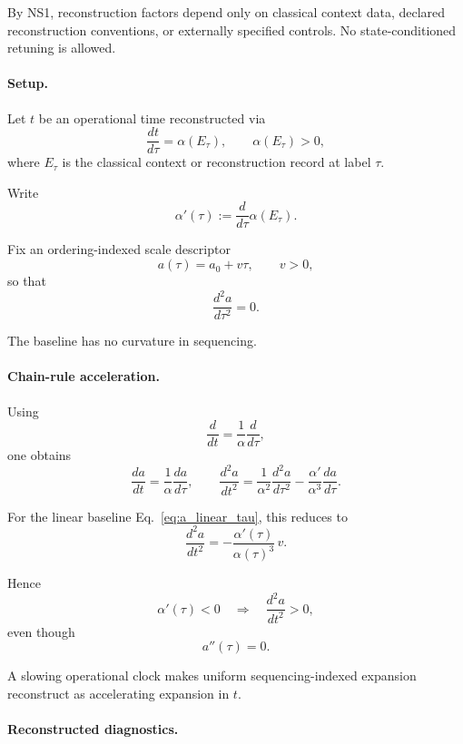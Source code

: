 \documentclass[aps,prx,onecolumn,11pt]{revtex4-2}
\theoremstyle{plain}
\theoremstyle{definition}
\theoremstyle{remark}
\begin{document}
By NS1, reconstruction factors depend only on classical context data,
declared reconstruction conventions, or externally specified controls.
No state-conditioned retuning is allowed.

\paragraph{Setup.}

Let \(t\) be an operational time reconstructed via
\begin{equation}
\frac{dt}{d\tau}
=
\alpha(E_\tau),
\qquad
\alpha(E_\tau)>0,
\label{eq:clock_factor}
\end{equation}
where \(E_\tau\) is the classical context or reconstruction record at
label \(\tau\).

Write
\[
\alpha'(\tau)
:=
\frac{d}{d\tau}\alpha(E_\tau).
\]

Fix an ordering-indexed scale descriptor
\begin{equation}
a(\tau)
=
a_0+v\tau,
\qquad
v>0,
\label{eq:a_linear_tau}
\end{equation}
so that
\[
\frac{d^2a}{d\tau^2}=0.
\]

The baseline has no curvature in sequencing.

\paragraph{Chain-rule acceleration.}

Using
\[
\frac{d}{dt}
=
\frac{1}{\alpha}
\frac{d}{d\tau},
\]
one obtains
\begin{equation}
\frac{da}{dt}
=
\frac{1}{\alpha}
\frac{da}{d\tau},
\qquad
\frac{d^2a}{dt^2}
=
\frac{1}{\alpha^2}
\frac{d^2a}{d\tau^2}
-
\frac{\alpha'}{\alpha^3}
\frac{da}{d\tau}.
\label{eq:a_tt_general}
\end{equation}

For the linear baseline Eq.~\eqref{eq:a_linear_tau}, this reduces to
\begin{equation}
\frac{d^2a}{dt^2}
=
-
\frac{\alpha'(\tau)}{\alpha(\tau)^3}\,v.
\label{eq:a_tt_linear_tau}
\end{equation}

Hence
\[
\alpha'(\tau)<0
\quad\Longrightarrow\quad
\frac{d^2a}{dt^2}>0,
\]
even though
\[
a''(\tau)=0.
\]

A slowing operational clock makes uniform sequencing-indexed expansion
reconstruct as accelerating expansion in \(t\).

\paragraph{Reconstructed diagnostics.}
\end{document}
